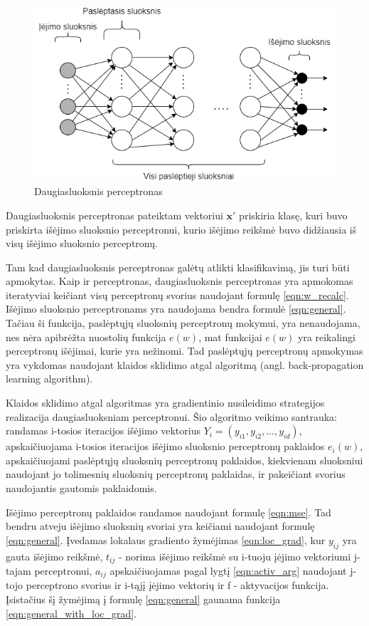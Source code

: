 \begin{figure}[H]
	\centering
	\includegraphics[scale=0.5]{img/neural_network.png}
	\caption{Daugiasluoksnis perceptronas}
	\label{img:nn}
\end{figure}

Daugiasluoksnis perceptronas pateiktam vektoriui $\boldsymbol{x}'$ priskiria klasę, kuri buvo priskirta išėjimo sluoksnio perceptronui, kurio išėjimo reikšmė buvo didžiausia iš visų išėjimo sluoksnio perceptronų.

Tam kad daugiasluoksnis perceptronas galėtų atlikti klasifikavimą, jis turi būti apmokytas. Kaip ir perceptronas, daugiasluoksnis perceptronas yra apmokomas iteratyviai keičiant visų perceptronų svorius naudojant formulę \ref{eqn:w_recalc}. Išėjimo sluoksnio perceptronams yra naudojama bendra formulė \ref{eqn:general}. Tačiau ši funkcija, paslėptųjų sluoksnių perceptronų mokymui, yra nenaudojama, nes nėra apibrėžta nuostolių funkcija $e(w)$, mat funkcijai $e(w)$ yra reikalingi perceptronų išėjimai, kurie yra nežinomi. Tad paslėptųjų perceptronų apmokymas yra vykdomas naudojant klaidos sklidimo atgal algoritmą (angl. back-propagation learning algorithm).

Klaidos sklidimo atgal algoritmas yra gradientinio nusileidimo strategijos realizacija daugiasluoksniam perceptronui. Šio algoritmo veikimo santrauka: randamas i-tosios iteracijos išėjimo vektorius $Y_i = (y_{i1}, y_{i2}, ..., y_{id})$, apskaičiuojama i-tosios iteracijos išėjimo sluoksnio perceptronų paklaidos $e_i(w)$, apskaičiuojami paslėptųjų sluoksnių perceptronų paklaidos, kiekvienam sluoksniui naudojant jo tolimesnių sluoksnių perceptronų paklaidas, ir pakeičiant svorius naudojantis gautomis paklaidomis.

Išėjimo perceptronų paklaidos randamos naudojant formulę \ref{eqn:mse}. Tad bendru atveju išėjimo sluoksnių svoriai yra keičiami naudojant formulę \ref{eqn:general}. Įvedamas lokalaus gradiento žymėjimas \ref{eqn:loc_grad}, kur $y_{ij}$ yra gauta išėjimo reikšmė, $t_{ij}$ - norima išėjimo reikšmė su i-tuoju įėjimo vektoriumi j-tajam perceptronui, $a_{ij}$ apskaičiuojamas pagal lygtį \ref{eqn:activ_arg} naudojant j-tojo perceptrono svorius ir i-tąjį įėjimo vektorių ir f - aktyvacijos funkcija. Įsistačius šį žymėjimą į formulę \ref{eqn:general} gaunama funkcija \ref{eqn:general_with_loc_grad}.

